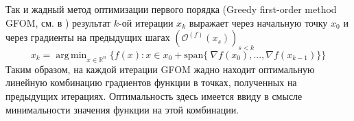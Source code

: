 \documentclass{article}
\DeclareMathOperator*{\argmin}{arg\,min}
\begin{document}
Так и жадный метод оптимизации первого порядка (Greedy first-order method GFOM, см. в \cite{drori2020efficient}) результат $k$-ой итерации $x_k$ выражает через начальную точку $x_0$ и через градиенты на предыдущих шагах $(\mathcal{O}^{(f)}(x_s))_{s < k}$
\[x_k = \argmin_{x \in \mathbb{R}^n}\{f(x): x \in x_0 + \text{span}\{\ \nabla f(x_0), ..., \nabla f(x_{k-1})\}\} \tag{GFOM}\]
Таким образом, на каждой итерации GFOM жадно находит оптимальную линейную комбинацию градиентов функции в точках, полученных на предыдущих итерациях. Оптимальность здесь имеется ввиду в смысле минимальности значения функции на этой комбинации.  








\end{document}
